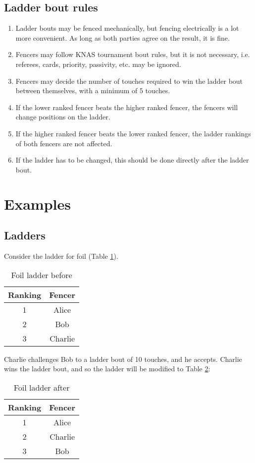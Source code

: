 \documentclass{article}
\begin{document}
\subsection{Ladder bout rules}
\begin{enumerate} 
    \item Ladder bouts may be fenced mechanically, but fencing electrically is a lot more convenient. As long as both parties agree on the result, it is fine.
    \item Fencers may follow KNAS tournament bout rules, but it is not necessary, i.e. referees, cards, priority, passivity, etc. may be ignored.
    \item Fencers may decide the number of touches required to win the ladder bout between themselves, with a minimum of 5 touches.
    \item If the lower ranked fencer beats the higher ranked fencer, the fencers will change positions on the ladder.
    \item If the higher ranked fencer beats the lower ranked fencer, the ladder rankings of both fencers are not affected.
    \item If the ladder has to be changed, this should be done directly after the ladder bout.
\end{enumerate}
\section{Examples}
\subsection{Ladders}
Consider the ladder for foil (Table \ref{tab:foil}).
\begin{table}[ht]
    \centering
    \begin{tabular}{|c|c|}
        \hline
        Ranking & Fencer \\ \hline
        1 & Alice \\ \hline
        2 & Bob \\ \hline
        3 & Charlie \\ \hline
    \end{tabular}
    \caption{Foil ladder before}
    \label{tab:foil}
\end{table}
Charlie challenges Bob to a ladder bout of 10 touches, and he accepts. Charlie wins the ladder bout, and so the ladder will be modified to Table \ref{tab:foil2}:
\begin{table}[ht]
    \centering
    \begin{tabular}{|c|c|}
        \hline
        Ranking & Fencer \\ \hline
        1 & Alice \\ \hline
        2 & Charlie \\ \hline
        3 & Bob \\ \hline
    \end{tabular}
    \caption{Foil ladder after}
    \label{tab:foil2}
\end{table}
\end{document}
